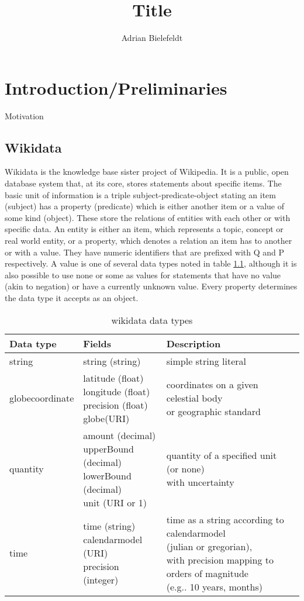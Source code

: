 \documentclass[hyperref,bachelorofscience,fleqn]{cgvpub}
\author{Adrian Bielefeldt}
\title{Title}
\begin{document}
\chapter{Introduction/Preliminaries}
Motivation
\newpage
\section{Wikidata}
Wikidata is the knowledge base sister project of Wikipedia. It is a public, open database system that, at its core, stores statements about specific items. The basic unit of information is a triple subject-predicate-object stating an item (subject) has a property (predicate) which is either another item or a value of some kind (object). These store the relations of entities with each other or with specific data. An entity is either an item, which represents a topic, concept or real world entity, or a property, which denotes a relation an item has to another or with a value. They have numeric identifiers that are prefixed with Q and P respectively. A value is one of several data types noted in table \ref{tab_datatypes}, although it is also possible to use none or some as values for statements that have no value (akin to negation) or have a currently unknown value. Every property determines the data type it accepts as an object. \\

\begin{table}[H]
\caption{wikidata data types}\label{tab_datatypes}
\begin{tabularx}{\textwidth}{lllX}
Data type & Fields & Description \\
\hline
string & string (string) & simple string literal \\
globecoordinate & \makecell{latitude (float) \\ longitude (float) \\ precision (float) \\ globe(URI)} & \makecell{coordinates on a given celestial body \\ or geographic standard} \\
quantity & \makecell {amount (decimal) \\ upperBound (decimal) \\ lowerBound (decimal) \\ unit (URI or 1)} & \makecell{quantity of a specified unit (or none) \\ with uncertainty} \\
time & \makecell {time (string) \\ calendarmodel (URI) \\ precision (integer)} & \makecell {time as a string according to calendarmodel \\ (julian or gregorian),\\ with precision mapping to orders of magnitude \\ (e.g.. 10 years, months)} \\
\end{tabularx}
\end{table}
\end{document}
